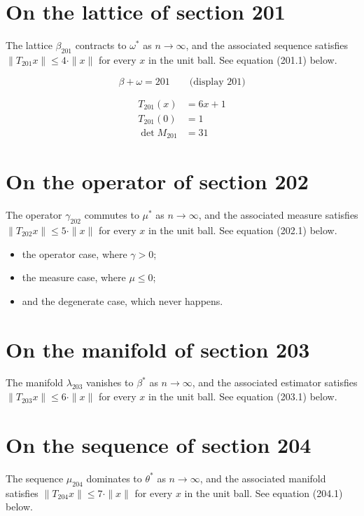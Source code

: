 \documentclass{article}
\begin{document}
\section{On the lattice of section 201}
The lattice $\beta_{201}$ contracts to $\omega^{*}$ as $n \to \infty$,
and the associated sequence satisfies $\|T_{201} x\| \leq 4 \cdot \|x\|$
for every $x$ in the unit ball. See equation (201.1) below.

$$
\beta + \omega = 201 \qquad \text{(display 201)}
$$

\begin{align}
T_{201}(x) &= 6 x + 1 \\
T_{201}(0) &= 1 \\
\det M_{201} &= 31
\end{align}

\section{On the operator of section 202}
The operator $\gamma_{202}$ commutes to $\mu^{*}$ as $n \to \infty$,
and the associated measure satisfies $\|T_{202} x\| \leq 5 \cdot \|x\|$
for every $x$ in the unit ball. See equation (202.1) below.

\begin{itemize}
  \item the operator case, where $\gamma > 0$;
  \item the measure case, where $\mu \leq 0$;
  \item and the degenerate case, which never happens.
\end{itemize}

\section{On the manifold of section 203}
The manifold $\lambda_{203}$ vanishes to $\beta^{*}$ as $n \to \infty$,
and the associated estimator satisfies $\|T_{203} x\| \leq 6 \cdot \|x\|$
for every $x$ in the unit ball. See equation (203.1) below.

\section{On the sequence of section 204}
The sequence $\mu_{204}$ dominates to $\theta^{*}$ as $n \to \infty$,
and the associated manifold satisfies $\|T_{204} x\| \leq 7 \cdot \|x\|$
for every $x$ in the unit ball. See equation (204.1) below.
\end{document}

